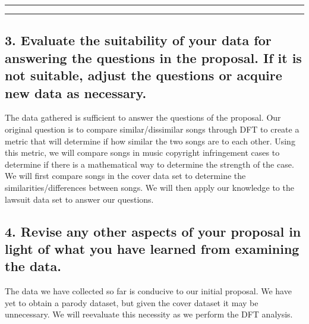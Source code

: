 \documentclass[11pt]{article}
\begin{document}
\begin{center}\rule{0.5\linewidth}{\linethickness}\end{center}

\begin{center}\rule{0.5\linewidth}{\linethickness}\end{center}

    \hypertarget{evaluate-the-suitability-of-your-data-for-answering-the-questions-in-the-proposal.-if-it-is-not-suitable-adjust-the-questions-or-acquire-new-data-as-necessary.}{%
\subsection{\texorpdfstring{\textbf{3. Evaluate the suitability of your
data for answering the questions in the proposal. If it is not suitable,
adjust the questions or acquire new data as
necessary.}}{3. Evaluate the suitability of your data for answering the questions in the proposal. If it is not suitable, adjust the questions or acquire new data as necessary.}}\label{evaluate-the-suitability-of-your-data-for-answering-the-questions-in-the-proposal.-if-it-is-not-suitable-adjust-the-questions-or-acquire-new-data-as-necessary.}}

The data gathered is sufficient to answer the questions of the proposal.
Our original question is to compare similar/dissimilar songs through DFT
to create a metric that will determine if how similar the two songs are
to each other. Using this metric, we will compare songs in music
copyright infringement cases to determine if there is a mathematical way
to determine the strength of the case. We will first compare songs in
the cover data set to determine the similarities/differences between
songs. We will then apply our knowledge to the lawsuit data set to
answer our questions.

    \hypertarget{revise-any-other-aspects-of-your-proposal-in-light-of-what-you-have-learned-from-examining-the-data.}{%
\subsection{\texorpdfstring{\textbf{4. Revise any other aspects of your
proposal in light of what you have learned from examining the
data.}}{4. Revise any other aspects of your proposal in light of what you have learned from examining the data.}}\label{revise-any-other-aspects-of-your-proposal-in-light-of-what-you-have-learned-from-examining-the-data.}}

The data we have collected so far is conducive to our initial proposal.
We have yet to obtain a parody dataset, but given the cover dataset it
may be unnecessary. We will reevaluate this necessity as we perform the
DFT analysis.


    
    
    
    
\end{document}

